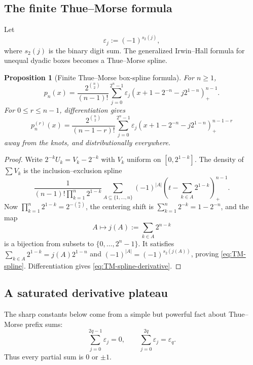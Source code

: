 \documentclass[11pt]{article}
\numberwithin{equation}{section}
\newtheorem{proposition}[theorem]{Proposition}
\theoremstyle{definition}
\theoremstyle{remark}
\newcommand{\pospart}[1]{\left(#1\right)_{+}}
\newcommand{\TM}{\varepsilon}
\begin{document}
\subsection{The finite Thue--Morse formula}

Let
\begin{equation}
 \TM_j:=(-1)^{s_2(j)},
 \label{eq:TM-sign}
\end{equation}
where $s_2(j)$ is the binary digit sum.  The generalized Irwin--Hall formula for unequal dyadic boxes becomes a Thue--Morse spline.

\begin{proposition}[Finite Thue--Morse box-spline formula]
\label{prop:TM-spline}
For $n\ge1$,
\begin{equation}
 \boxed{
 p_n(x)=\frac{2^{\binom n2}}{(n-1)!}
 \sum_{j=0}^{2^n-1}\TM_j
 \pospart{x+1-2^{-n}-j2^{1-n}}^{n-1}.}
 \label{eq:TM-spline}
\end{equation}
For $0\le r\le n-1$, differentiation gives
\begin{equation}
 p_n^{(r)}(x)=\frac{2^{\binom n2}}{(n-1-r)!}
 \sum_{j=0}^{2^n-1}\TM_j
 \pospart{x+1-2^{-n}-j2^{1-n}}^{n-1-r}
 \label{eq:TM-spline-derivative}
\end{equation}
away from the knots, and distributionally everywhere.
\end{proposition}

\begin{proof}
Write $2^{-k}U_k=V_k-2^{-k}$ with $V_k$ uniform on $[0,2^{1-k}]$.  The density of $\sum V_k$ is the inclusion--exclusion spline
\[
 \frac1{(n-1)!\prod_{k=1}^n2^{1-k}}
 \sum_{A\subseteq\{1,\ldots,n\}}(-1)^{|A|}
 \left(t-\sum_{k\in A}2^{1-k}\right)_+^{n-1}.
\]
Now \(\prod_{k=1}^n2^{1-k}=2^{-\binom n2}\), the centering shift is
\(\sum_{k=1}^n2^{-k}=1-2^{-n}\), and the map
\[
 A\longmapsto j(A):=\sum_{k\in A}2^{n-k}
\]
is a bijection from subsets to $\{0,\ldots,2^n-1\}$.  It satisfies
\(\sum_{k\in A}2^{1-k}=j(A)2^{1-n}\) and
\((-1)^{|A|}=(-1)^{s_2(j(A))}\), proving \eqref{eq:TM-spline}.  Differentiation gives \eqref{eq:TM-spline-derivative}.
\end{proof}

\subsection{A saturated derivative plateau}

The sharp constants below come from a simple but powerful fact about Thue--Morse prefix sums:
\begin{equation}
 \sum_{j=0}^{2q-1}\TM_j=0,
 \qquad
 \sum_{j=0}^{2q}\TM_j=\TM_q.
 \label{eq:TM-prefix-two-valued}
\end{equation}
Thus every partial sum is $0$ or $\pm1$.
\end{document}
